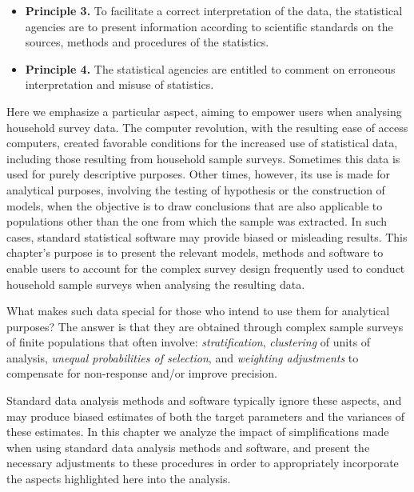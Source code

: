 \documentclass[
  12pt,
]{book}
\begin{document}
\begin{itemize}
\item
  \textbf{Principle 3.} To facilitate a correct interpretation of the data, the statistical
  agencies are to present information according to scientific standards on the sources,
  methods and procedures of the statistics.
\item
  \textbf{Principle 4.} The statistical agencies are entitled to comment on erroneous
  interpretation and misuse of statistics.
\end{itemize}

Here we emphasize a particular aspect, aiming to empower users when analysing household survey data. The computer revolution, with the resulting ease of access computers, created favorable conditions for the increased use of statistical data, including those resulting from household sample surveys. Sometimes this data is used for purely descriptive purposes. Other times, however, its use is made for analytical purposes, involving the testing of hypothesis or the construction of models, when the objective is to draw conclusions that are also applicable to populations other than the one from which the sample was extracted. In such cases, standard statistical software may provide biased or misleading results. This chapter's purpose is to present the relevant models, methods and software to enable users to account for the complex survey design frequently used to conduct household sample surveys when analysing the resulting data.

What makes such data special for those who intend to use them for analytical purposes?
The answer is that they are obtained through complex sample surveys of finite populations that often involve: \emph{stratification}, \emph{clustering} of units of analysis, \emph{unequal probabilities of selection}, and \emph{weighting adjustments} to compensate for non-response and/or improve precision.

Standard data analysis methods and software typically ignore these aspects, and may produce biased estimates of both the target parameters and the variances of these estimates. In this chapter we analyze the impact of simplifications made when using standard data analysis methods and software, and present the necessary adjustments to these procedures in order to appropriately incorporate the aspects highlighted here into the analysis.
\end{document}
